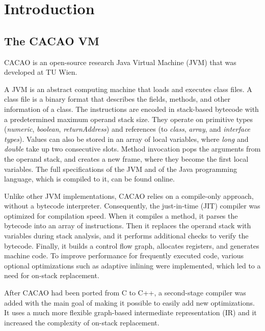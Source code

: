 \documentclass[draft,final]{vutinfth} %
\begin{document}
    \mainmatter


    \chapter{Introduction}


    \section{The CACAO VM}

    CACAO is an open-source research Java Virtual Machine (JVM)
    that was developed at TU Wien.\cite{cacao-homepage,cacao-repo,cacao-64bit-jit}

    A JVM is an abstract computing machine that loads and executes class files.
    A class file is a binary format that describes the fields, methods, and other information of a class.
    The instructions are encoded in stack-based bytecode with a predetermined maximum operand stack size.
    They operate on primitive types (\emph{numeric}, \emph{boolean}, \emph{returnAddress}) and references (to \emph{class}, \emph{array}, and \emph{interface types}).
    Values can also be stored in an array of local variables,
    where \emph{long} and \emph{double} take up two consecutive slots.
    Method invocation pops the arguments from the operand stack,
    and creates a new frame, where they become the first local variables.
    The full specifications of the JVM and of the Java programming language, which is compiled to it, can be found online\cite{JavaSE}.

    Unlike other JVM implementations,
    CACAO relies on a compile-only approach, without a bytecode interpreter.
    Consequently, the just-in-time (JIT) compiler was optimized for compilation speed.
    When it compiles a method, it parses the bytecode into an array of instructions.
    Then it replaces the operand stack with variables during stack analysis,
    and it performs additional checks to verify the bytecode.
    Finally, it builds a control flow graph, allocates registers, and generates machine code.
    To improve performance for frequently executed code,
    various optional optimizations such as adaptive inlining were implemented,
    which led to a need for on-stack replacement\cite{10.1145/1294325.1294356}.

    After CACAO had been ported from C to C++, a second-stage compiler\cite{EislJosef2013Offt} was added
    with the main goal of making it possible to easily add new optimizations.
    It uses a much more flexible graph-based intermediate representation (IR)
    and it increased the complexity of on-stack replacement.
\end{document}
